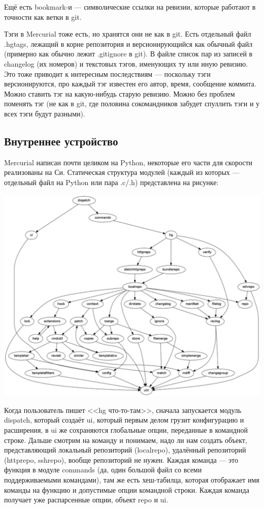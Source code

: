 \documentclass[a5paper]{article}
\begin{document}
Ещё есть bookmark-и --- символические ссылки на ревизии, которые работают в точности как ветки в git.

Тэги в Mercurial тоже есть, но хранятся они не как в git. Есть отдельный файл .hgtags, лежащий в корне репозитория и версионирующийся как обычный файл (примерно как обычно лежит .gitignore в git). В файле список пар из записей в changelog (их номеров) и текстовых тэгов, именующих ту или иную ревизию. Это тоже приводит к интересным последствиям --- поскольку тэги версионируются, про каждый тэг известен его автор, время, сообщение коммита. Можно ставить тэг на какую-нибудь старую ревизию. Можно без проблем поменять тэг (не как в git, где половина сокомандников забудет спуллить тэги и у всех тэги будут разными).

\subsection{Внутреннее устройство}

Mercurial написан почти целиком на Python, некоторые его части для скорости реализованы на Си. Статическая структура модулей (каждый из которых --- отдельный файл на Python или пара .c/.h) представлена на рисунке:

\begin{center}
	\includegraphics[width=\textwidth]{mercurialImportGraph.png}
\end{center}

Когда пользователь пишет <<hg что-то-там>>, сначала запускается модуль dispatch, который создаёт ui, который первым делом грузит конфигурацию и расширения, в ui же сохраняются глобальные опции, переданные в командной строке. Дальше смотрим на команду и понимаем, надо ли нам создать объект, представляющий локальный репозиторий (localrepo), удалённый репозиторий (httprepo, sshrepo), вообще репозиторий не нужен. Каждая команда --- это функция в модуле commands (да, один большой файл со всеми поддерживаемыми командами), там же есть хеш-табилца, которая отображает имя команды на функцию и допустимые опции командной строки. Каждая команда получает уже распарсенные опции, объект repo и ui.
\end{document}
